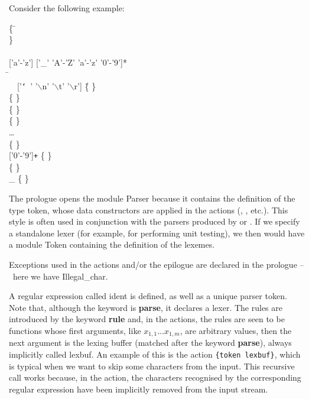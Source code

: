 Consider the following example:
\begin{tabbing}
\{ \= \Xopen {}\\
   \> \Xexception {} \Xof {} \}\\
\\
\Xlet {} \equal \textsf{['a'-'z'] ['\_' 'A'-'Z' 'a'-'z' '0'-'9']*}\\
\Xrule \=  \equal \Xparse\\
  \> \ \ \textsf{['{\tt\char`\ }' '\(\backslash\)n' '\(\backslash\)t'
   '\(\backslash\)r']} \= \{   \}\\
  \> \vbar{}  \> \{ \Tlet \}\\
  \> \vbar{}  \> \{ \Trec \}\\
  \> \vbar{} \str{=}   \> \{ \Tequal \}\\
  \> \ldots \\
  \> \vbar{}  \Xas {} \> \{ \Tident {} \}\\
  \> \vbar{} \textsf{['0'-'9']\texttt{+}} \Xas {} \> \{ \Tint
     \lpar{} \rpar{} \}\\
  \> \vbar{}  \> \{ \Teof \}\\
  \> \vbar{} {\large \_} \Xas {} \> \{ 
     \lpar{}  \rpar{} \}
\end{tabbing}
The prologue opens the module \textsf{Parser} because it contains the
definition of the type \textsf{token}, whose data constructors are
applied in the actions (, , etc.). This style is
often used in conjunction with the parsers produced by \menhir or
\ocamlyacc. If we specify a standalone lexer (for example, for
performing unit testing), we then would have a module \textsf{Token}
containing the definition of the lexemes.

Exceptions used in the actions and/or the epilogue are declared in the
prologue --~here we have \textsf{Illegal\_char}.

A regular expression called \textsf{ident} is defined, as well as a
unique parser \textsf{token}. Note that, although the \ocamllex
keyword is \textbf{\textsf{parse}}, it declares a lexer. The rules are
introduced by the keyword \textbf{\textsf{rule}} and, in the actions,
the rules are seen to be functions whose first arguments, like
\(x_{1,1} \dots x_{1,m}\), are arbitrary \OCaml values, then the next
argument is the lexing buffer (matched after the keyword
\textbf{\textsf{parse}}), always implicitly called \textsf{lexbuf}. An
example of this is the action \texttt{\{token lexbuf\}}, which is
typical when we want to skip some characters from the input. This
recursive call works because, in the action, the characters recognised
by the corresponding regular expression have been implicitly removed
from the input stream.

